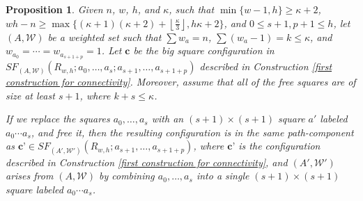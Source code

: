 \documentclass[pagebackref,colorlinks,citecolor=blue,linkcolor=blue,urlcolor=blue,filecolor=blue]{article}
\newtheorem{prop}[thm]{Proposition}
\theoremstyle{definition}\newtheorem{definition}[thm]{Definition}
\theoremstyle{definition}
\begin{document}
\begin{prop}\label{move the big squares around}
Given $n$, $w$, $h$, and $\kappa$, such that $\min\{w-1,h\}\ge \kappa+2$, $wh-n\ge \max\big\{(\kappa+1)(\kappa+2)+\left\lfloor\frac{\kappa}{3}\right\rfloor, h\kappa+2\big\}$,
and $0\le s+1, p+1\le h$,
let $(A, \mathcal{W})$ be a weighted set such that $\sum w_{a}=n$, $\sum(w_{a}-1)=k\le \kappa$, and $w_{a_{0}}=\cdots=w_{a_{s+1+p}}=1$.
Let $\textbf{c}$ be the big square configuration in $SF_{(A, \mathcal{W})}(R_{w, h}; a_{0},\dots, a_{s};a_{s+1},\dots, a_{s+1+p})$ described in Construction \ref{first construction for connectivity}.
Moreover, assume that all of the free squares are of size at least $s+1$, where $k+s\le \kappa$.

If we replace the squares $a_{0},\dots, a_{s}$ with an $(s+1)\times (s+1)$ square $a'$ labeled $a_{0}\cdots a_{s}$, and free it, then the resulting configuration is in the same path-component as $\textbf{c'}\in SF_{(A', \mathcal{W}')}(R_{w, h};a_{s+1},\dots, a_{s+1+p})$, where $\textbf{c'}$ is the configuration described in Construction \ref{first construction for connectivity}, and $(A', \mathcal{W}')$ arises from $(A, \mathcal{W})$ by combining $a_{0}, \dots, a_{s}$ into a single $(s+1)\times (s+1)$ square labeled $a_{0}\cdots a_{s}$.
\end{prop}
\end{document}
